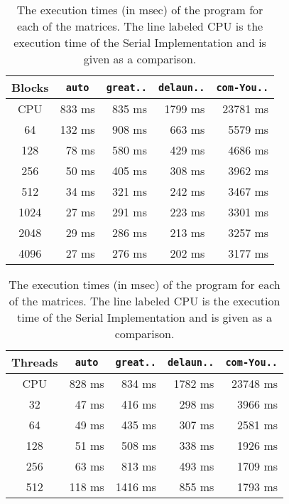 \documentclass[10pt, a4paper]{article}
\begin{document}
\begin{table}[h!]
	\centering

	\caption{
		The execution times (in msec) of the program for each of the matrices. The line labeled CPU is 
		the execution time of the Serial Implementation and is given as a comparison.}

	\begin{subtable}[T]{0.45 \textwidth}
		\centering
		\begin{tabular}{|c|*{4}{r|}}
			\hline
			Blocks & \verb| auto | & \verb|great..| & \verb|delaun..| & \verb|com-You..| \\
			\hline \hline
			CPU   & 833 ms  & 835 ms  & 1799 ms  & 23781 ms \\
			\hline
			64    & 132 ms  & 908 ms  &  663 ms  & 5579 ms \\
			128   &  78 ms  & 580 ms  &  429 ms  & 4686 ms \\
			256   &  50 ms  & 405 ms  &  308 ms  & 3962 ms \\
			512   &  34 ms  & 321 ms  &  242 ms  & 3467 ms \\
			1024  &  27 ms  & 291 ms  &  223 ms  & 3301 ms \\
			2048  &  29 ms  & 286 ms  &  213 ms  & 3257 ms \\
			4096  &  27 ms  & 276 ms  &  202 ms  & 3177 ms \\
			\hline
		\end{tabular}
		\label{times:blocks}
	\end{subtable}
	\hspace{0.5cm}
	\begin{subtable}[T]{0.45 \textwidth}
		\centering
		\begin{tabular}{|c|*{4}{r|}}
			\hline
			Threads & \verb| auto | & \verb|great..| & \verb|delaun..| & \verb|com-You..| \\
			\hline \hline
			CPU     & 828 ms  &  834 ms  & 1782 ms  & 23748 ms \\
			\hline
			32      &  47 ms  &  416 ms  &  298 ms  & 3966 ms \\
			64      &  49 ms  &  435 ms  &  307 ms  & 2581 ms \\
			128     &  51 ms  &  508 ms  &  338 ms  & 1926 ms \\
			256     &  63 ms  &  813 ms  &  493 ms  & 1709 ms \\
			512     & 118 ms  & 1416 ms  &  855 ms  & 1793 ms \\
			\hline
		\end{tabular}
		\label{times:threads}
	\end{subtable}

	\label{times}
\end{table}
\end{document}
